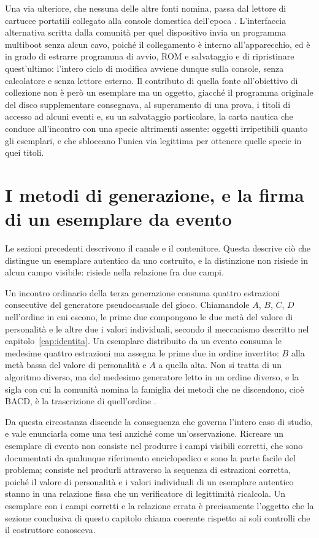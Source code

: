 Una via ulteriore, che nessuna delle altre fonti nomina, passa dal lettore di cartucce portatili collegato alla console domestica dell'epoca \cite{video-gbi-bonus}. L'interfaccia alternativa scritta dalla comunità per quel dispositivo invia un programma multiboot senza alcun cavo, poiché il collegamento è interno all'apparecchio, ed è in grado di estrarre programma di avvio, ROM e salvataggio e di ripristinare quest'ultimo: l'intero ciclo di modifica avviene dunque sulla console, senza calcolatore e senza lettore esterno. Il contributo di quella fonte all'obiettivo di collezione non è però un esemplare ma un oggetto, giacché il programma originale del disco supplementare consegnava, al superamento di una prova, i titoli di accesso ad alcuni eventi e, su un salvataggio particolare, la carta nautica che conduce all'incontro con una specie altrimenti assente: oggetti irripetibili quanto gli esemplari, e che sbloccano l'unica via legittima per ottenere quelle specie in quei titoli.

\section{I metodi di generazione, e la firma di un esemplare da evento}

Le sezioni precedenti descrivono il canale e il contenitore. Questa descrive ciò che distingue un esemplare autentico da uno costruito, e la distinzione non risiede in alcun campo visibile: risiede nella relazione fra due campi.

Un incontro ordinario della terza generazione consuma quattro estrazioni consecutive del generatore pseudocasuale del gioco. Chiamandole $A$, $B$, $C$, $D$ nell'ordine in cui escono, le prime due compongono le due metà del valore di personalità e le altre due i valori individuali, secondo il meccanismo descritto nel capitolo~\ref{cap:identita}. Un esemplare distribuito da un evento consuma le medesime quattro estrazioni ma assegna le prime due in ordine invertito: $B$ alla metà bassa del valore di personalità e $A$ a quella alta. Non si tratta di un algoritmo diverso, ma del medesimo generatore letto in un ordine diverso, e la sigla con cui la comunità nomina la famiglia dei metodi che ne discendono, cioè BACD, è la trascrizione di quell'ordine \cite{pkhex-eventi-gen3}.

Da questa circostanza discende la conseguenza che governa l'intero caso di studio, e vale enunciarla come una tesi anziché come un'osservazione. Ricreare un esemplare di evento non consiste nel produrre i campi visibili corretti, che sono documentati da qualunque riferimento enciclopedico e sono la parte facile del problema; consiste nel produrli attraverso la sequenza di estrazioni corretta, poiché il valore di personalità e i valori individuali di un esemplare autentico stanno in una relazione fissa che un verificatore di legittimità ricalcola. Un esemplare con i campi corretti e la relazione errata è precisamente l'oggetto che la sezione conclusiva di questo capitolo chiama coerente rispetto ai soli controlli che il costruttore conosceva.

